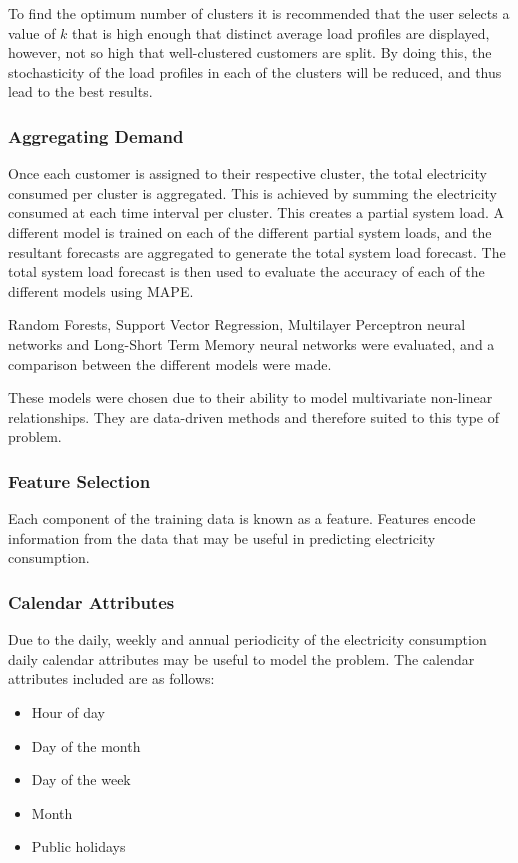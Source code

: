 To find the optimum number of clusters it is recommended that the user selects a value of $k$ that is high enough that distinct average load profiles are displayed, however, not so high that well-clustered customers are split. By doing this, the stochasticity of the load profiles in each of the clusters will be reduced, and thus lead to the best results.


\subsubsection{Aggregating Demand}

Once each customer is assigned to their respective cluster, the total electricity consumed per cluster is aggregated. This is achieved by summing the electricity consumed at each time interval per cluster. This creates a partial system load. A different model is trained on each of the different partial system loads, and the resultant forecasts are aggregated to generate the total system load forecast. The total system load forecast is then used to evaluate the accuracy of each of the different models using MAPE. 

Random Forests, Support Vector Regression, Multilayer Perceptron neural networks and Long-Short Term Memory neural networks were evaluated, and a comparison between the different models were made. 

These models were chosen due to their ability to model multivariate non-linear relationships. They are data-driven methods and therefore suited to this type of problem.

\subsubsection{Feature Selection}

Each component of the training data is known as a feature. Features encode information from the data that may be useful in predicting electricity consumption. 

\subsubsection{Calendar Attributes}

Due to the daily, weekly and annual periodicity of the electricity consumption daily calendar attributes may be useful to model the problem. The calendar attributes included are as follows:

\begin{itemize}
	\item Hour of day
	\item Day of the month
	\item Day of the week
	\item Month
	\item Public holidays
\end{itemize}


